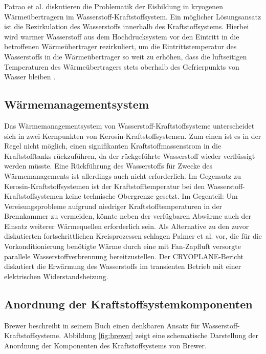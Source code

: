 Patrao et al. \cite{Patrao.2024} diskutieren die Problematik der Eisbildung in kryogenen Wärmeübertragern im Wasserstoff-Kraftstoffsystem. Ein möglicher Lösungsansatz ist die Rezirkulation des Wasserstoffs innerhalb des Kraftstoffsystems. Hierbei wird warmer Wasserstoff aus dem Hochdrucksystem vor den Eintritt in die betroffenen Wärmeübertrager rezirkuliert, um die Eintrittstemperatur des Wasserstoffs in die Wärmeübertrager so weit zu erhöhen, dass die luftseitigen Temperaturen des Wärmeübertragers stets oberhalb des Gefrierpunkts von Wasser bleiben \cite{Brewer.1991}. 

\subsection{Wärmemanagementsystem}

Das Wärmemanagementsystem von Wasserstoff-Kraftstoffsysteme unterscheidet sich in zwei Kernpunkten von Kerosin-Kraftstoffsystemen. Zum einen ist es in der Regel nicht möglich, einen signifikanten Kraftstoffmassenstrom in die Kraftstofftanks rückzuführen, da der rückgeführte Wasserstoff wieder verflüssigt werden müsste. Eine Rückführung des Wasserstoffs für Zwecke des Wärmemanagements ist allerdings auch nicht erforderlich. Im Gegensatz zu Kerosin-Kraftstoffsystemen ist der Kraftstofftemperatur bei den Wasserstoff-Kraftstoffsystemen keine technische Obergrenze gesetzt. Im Gegenteil: Um Vereisungsprobleme aufgrund niedriger Kraftstofftemperaturen in der Brennkammer zu vermeiden, könnte neben der verfügbaren Abwärme auch der Einsatz weiterer Wärmequellen erforderlich sein. Als Alternative zu den zuvor diskutierten fortschrittlichen Kreisprozessen schlagen Palmer et al. \cite{PalmerChloeJWhurrJohnR.2024} vor, die für die Vorkonditionierung benötigte Wärme durch eine mit Fan-Zapfluft versorgte parallele Wasserstoffverbrennung bereitzustellen. Der CRYOPLANE-Bericht \cite{Scholz.2003} diskutiert die Erwärmung des Wasserstoffs im transienten Betrieb mit einer elektrischen Widerstandsheizung.

\subsection{Anordnung der Kraftstoffsystemkomponenten}

Brewer \cite{Brewer.1991} beschreibt in seinem Buch einen denkbaren Ansatz für Wasserstoff-Kraftstoffsysteme. Abbildung \ref{fig:brewer} zeigt eine schematische Darstellung der Anordnung der Komponenten des Kraftstoffsystems von Brewer.


